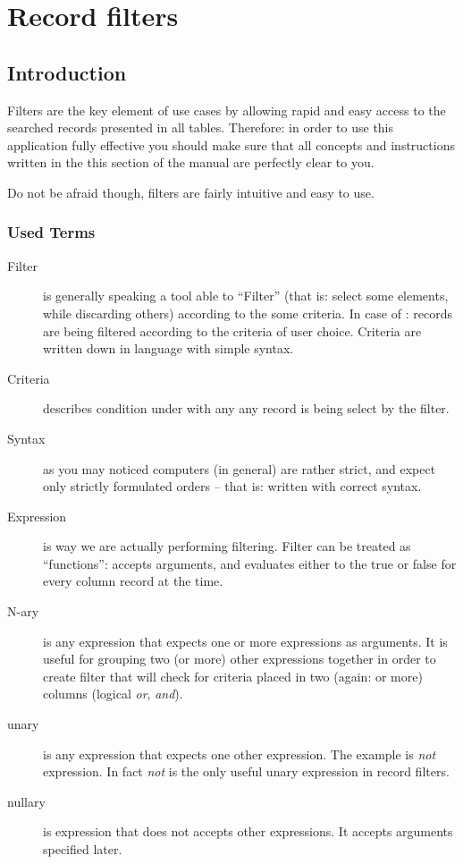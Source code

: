 \section{Record filters}
\subsection{Introduction}
Filters are the key element of \OCS{} use cases by allowing rapid and easy access to the searched records presented in all tables.
Therefore: in order to use this application fully effective you should make sure that all concepts and instructions written in
the this section of the manual are perfectly clear to you.

Do not be afraid though, filters are fairly intuitive and easy to use.

\subsubsection{Used Terms}

\begin{description}
 \item[Filter] is generally speaking a tool able to ``Filter'' (that is: select some elements, while discarding others) according
 to the some criteria. In case of \OCS: records are being filtered according to the criteria of user choice. Criteria are written
 down in language with simple syntax.
 \item[Criteria] describes condition under with any any record is being select by the filter.
 \item[Syntax] as you may noticed computers (in general) are rather strict, and expect only strictly formulated orders -- that is: written with correct syntax.
 \item[Expression] is way we are actually performing filtering. Filter can be treated as ``functions'': accepts arguments, and evaluates either to the true or false for every column record at the time.
 \item[N-ary] is any expression that expects one or more expressions as arguments. It is useful for grouping two (or more) other expressions
 together in order to create filter that will check for criteria placed in two (again: or more) columns (logical \textit{or}, \textit{and}).
 \item[unary] is any expression that expects one other expression. The example is \textit{not} expression. In fact \textit{not} is the only useful unary expression in \OCS{} record filters.
 \item[nullary] is expression that does not accepts other expressions. It accepts arguments specified later.
\end{description}

